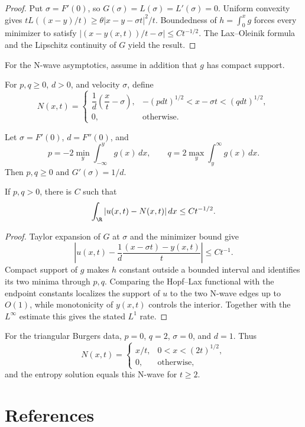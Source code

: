 \begin{proof}
\sketch Put $\sigma=F'(0)$, so $G(\sigma)=L(\sigma)=L'(\sigma)=0$.
Uniform convexity gives
$tL((x-y)/t)\ge\theta|x-y-\sigma t|^2/t$. Boundedness of
$h=\int_0^xg$ forces every minimizer to satisfy
$|(x-y(x,t))/t-\sigma|\le Ct^{-1/2}$. The Lax--Oleinik formula and the
Lipschitz continuity of $G$ yield the result.
\end{proof}

For the N-wave asymptotics, assume in addition that $g$ has compact support.

\begin{definition}[N-wave]
\label{def:n-wave}
For $p,q\ge0$, $d>0$, and velocity $\sigma$, define
\[
N(x,t)=\begin{cases}
\dfrac1d\left(\dfrac{x}{t}-\sigma\right),
&-(pdt)^{1/2}<x-\sigma t<(qdt)^{1/2},\\
0,&\text{otherwise}.
\end{cases}
\]
\end{definition}

Let $\sigma=F'(0)$, $d=F''(0)$, and
\[
p=-2\min_y\int_{-\infty}^y g(x)\,dx,\qquad
q=2\max_y\int_y^\infty g(x)\,dx.
\]
Then $p,q\ge0$ and $G'(\sigma)=1/d$.

\begin{theorem}
\label{thm:asymptotics-l1-norm-n-wave}
If $p,q>0$, there is $C$ such that
\[
\int_\R|u(x,t)-N(x,t)|\,dx\le Ct^{-1/2}.
\]
\end{theorem}

\begin{proof}
\sketch Taylor expansion of $G$ at $\sigma$ and the minimizer bound give
\[
\left|u(x,t)-\frac1d\frac{(x-\sigma t)-y(x,t)}{t}\right|\le Ct^{-1}.
\]
Compact support of $g$ makes $h$ constant outside a bounded interval and
identifies its two minima through $p,q$. Comparing the Hopf--Lax functional
with the endpoint constants localizes the support of $u$ to the two N-wave
edges up to $O(1)$, while monotonicity of $y(x,t)$ controls the interior.
Together with the $L^\infty$ estimate this gives the stated $L^1$ rate.
\end{proof}

\begin{example}
\label{ex:burgers-example-n-wave-specialization}
For the triangular Burgers data, $p=0$, $q=2$, $\sigma=0$, and $d=1$.
Thus
\[
N(x,t)=\begin{cases}x/t,&0<x<(2t)^{1/2},\\0,&\text{otherwise},\end{cases}
\]
and the entropy solution equals this N-wave for $t\ge2$.
\end{example}

\section{References}
\label{sec:ch3-references}

\noindent\cite{CourantHilbert1962,Caratheodory1982,Garabedian1964,John1982,Chester1971,Sneddon1957,Zwillinger1984,PLLions1982,Rund1973,Benton1977,Benton1977,Lax1973,Smoller1983,DiPerna1983,Whitham1974}
